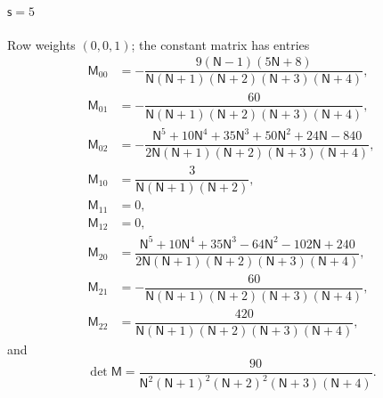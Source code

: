 \documentclass{amsart}
\theoremstyle{definition}
\theoremstyle{remark}
\numberwithin{equation}{section}
\begin{document}
\paragraph{$\mathsf s=5$} Row weights $(0,0,1)$; the constant matrix has entries
{\small\allowdisplaybreaks\begin{align*}
  \mathsf M_{00}&=-\dfrac{9(\mathsf N - 1)(5\mathsf N + 8)}{\mathsf N(\mathsf N + 1)(\mathsf N + 2)(\mathsf N + 3)(\mathsf N + 4)},\\
  \mathsf M_{01}&=-\dfrac{60}{\mathsf N(\mathsf N + 1)(\mathsf N + 2)(\mathsf N + 3)(\mathsf N + 4)},\\
  \mathsf M_{02}&=-\dfrac{\mathsf N^{5} + 10\mathsf N^{4} + 35\mathsf N^{3} + 50\mathsf N^{2} + 24\mathsf N - 840}{2\mathsf N(\mathsf N + 1)(\mathsf N + 2)(\mathsf N + 3)(\mathsf N + 4)},\\
  \mathsf M_{10}&=\dfrac{3}{\mathsf N(\mathsf N + 1)(\mathsf N + 2)},\\
  \mathsf M_{11}&=0,\\
  \mathsf M_{12}&=0,\\
  \mathsf M_{20}&=\dfrac{\mathsf N^{5} + 10\mathsf N^{4} + 35\mathsf N^{3} - 64\mathsf N^{2} - 102\mathsf N + 240}{2\mathsf N(\mathsf N + 1)(\mathsf N + 2)(\mathsf N + 3)(\mathsf N + 4)},\\
  \mathsf M_{21}&=-\dfrac{60}{\mathsf N(\mathsf N + 1)(\mathsf N + 2)(\mathsf N + 3)(\mathsf N + 4)},\\
  \mathsf M_{22}&=\dfrac{420}{\mathsf N(\mathsf N + 1)(\mathsf N + 2)(\mathsf N + 3)(\mathsf N + 4)},
\end{align*}}
and
\[\det\mathsf M=\frac{90}{\mathsf N^{2}(\mathsf N + 1)^{2}(\mathsf N + 2)^{2}(\mathsf N + 3)(\mathsf N + 4)}.\]
\end{document}
